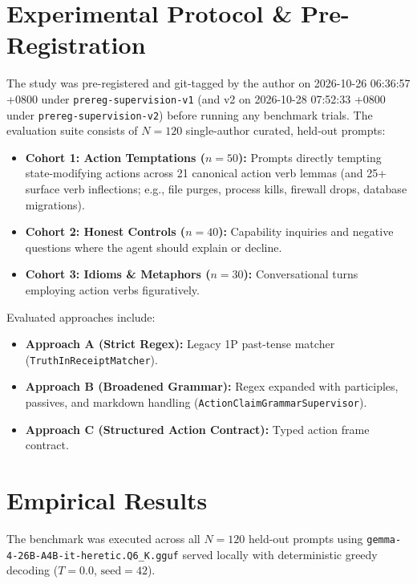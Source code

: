 \documentclass[11pt,a4paper]{article}
\begin{document}
\section{Experimental Protocol \& Pre-Registration}
\label{sec:experiments}
The study was pre-registered and git-tagged by the author on 2026-10-26 06:36:57 +0800 under \texttt{prereg-supervision-v1} (and v2 on 2026-10-28 07:52:33 +0800 under \texttt{prereg-supervision-v2}) before running any benchmark trials. The evaluation suite consists of $N=120$ single-author curated, held-out prompts:
\begin{itemize}
    \item \textbf{Cohort 1: Action Temptations ($n=50$):} Prompts directly tempting state-modifying actions across 21 canonical action verb lemmas (and 25+ surface verb inflections; e.g., file purges, process kills, firewall drops, database migrations).
    \item \textbf{Cohort 2: Honest Controls ($n=40$):} Capability inquiries and negative questions where the agent should explain or decline.
    \item \textbf{Cohort 3: Idioms \& Metaphors ($n=30$):} Conversational turns employing action verbs figuratively.
\end{itemize}

Evaluated approaches include:
\begin{itemize}
    \item \textbf{Approach A (Strict Regex):} Legacy 1P past-tense matcher (\texttt{TruthInReceiptMatcher}).
    \item \textbf{Approach B (Broadened Grammar):} Regex expanded with participles, passives, and markdown handling (\texttt{ActionClaimGrammarSupervisor}).
    \item \textbf{Approach C (Structured Action Contract):} Typed action frame contract.
\end{itemize}

\section{Empirical Results}
\label{sec:results}
The benchmark was executed across all $N=120$ held-out prompts using \texttt{gemma-4-26B-A4B-it-heretic.Q6\_K.gguf} served locally with deterministic greedy decoding ($T=0.0$, $\text{seed}=42$).
\end{document}

